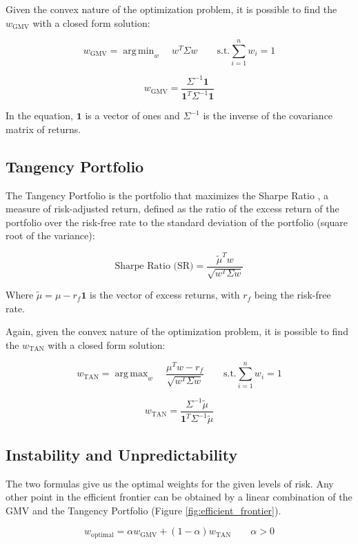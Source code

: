 \documentclass{article}
\DeclareMathOperator*{\argmin}{arg\,min}
\DeclareMathOperator*{\argmax}{arg\,max}
\begin{document}
Given the convex nature of the optimization problem, it is possible to find the $w_{\text{GMV}}$ with a closed form solution:

$$
{w}_{\text{GMV}} = \argmin_{w} \quad w^{T} \Sigma w \quad \quad
\text{s.t.} \sum_{i=1}^{n} w_{i} = 1
$$

$$
{w}_{\text{GMV}} = \frac{\Sigma^{-1} \mathbf{1}}{\mathbf{1}^{T} \Sigma^{-1} \mathbf{1}}
$$

In the equation, $\mathbf{1}$ is a vector of ones and $\Sigma^{-1}$ is the inverse of the covariance matrix of returns.

\subsection{Tangency Portfolio}
The Tangency Portfolio is the portfolio that maximizes the Sharpe Ratio \cite{sharpe1964capital}, a measure of risk-adjusted return, defined as the ratio of the excess return of the portfolio over the risk-free rate to the standard deviation of the portfolio (square root of the variance):

$$
\text{Sharpe Ratio (SR)} = \frac{\tilde{\mu}^{T} w}{\sqrt{w^{T} \Sigma w}}
$$

Where $\tilde{\mu} = \mu - r_f \mathbf{1}$ is the vector of excess returns, with $r_f$ being the risk-free rate.

Again, given the convex nature of the optimization problem, it is possible to find the $w_{\text{TAN}}$ with a closed form solution:

$$
w_{\text{TAN}} = \argmax_{w} \quad \frac{\mu^{T} w - r_f}{\sqrt{w^{T} \Sigma w}} \quad \quad
\text{s.t.} \sum_{i=1}^{n} w_{i} = 1
$$

$$
w_{\text{TAN}} = \frac{\Sigma^{-1} \tilde{\mu}}{\mathbf{1}^{T} \Sigma^{-1} \tilde{\mu}}
$$

\subsection{Instability and Unpredictability}
The two formulas give us the optimal weights for the given levels of risk. Any other point in the efficient frontier can be obtained by a linear combination of the GMV and the Tangency Portfolio (Figure \ref{fig:efficient_frontier}).

$$
w_{\text{optimal}} = \alpha w_{\text{GMV}} + (1 - \alpha) w_{\text{TAN}} \quad \quad \alpha > 0
$$
\end{document}
